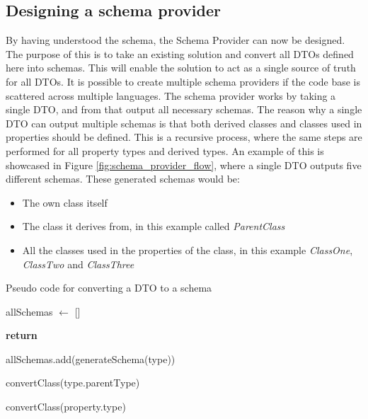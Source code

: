 \subsection{Designing a schema provider \label{sec:design:schema_provider}}
By having understood the schema, the Schema Provider can now be designed. The purpose of this is to take an existing solution and convert all DTOs defined here into schemas. This will enable the solution to act as a single source of truth for all DTOs.
It is possible to create multiple schema providers if the code base is scattered across multiple languages.
\newline\newline
The schema provider works by taking a single DTO, and from that output all necessary schemas. 
The reason why a single DTO can output multiple schemas is that both derived classes and classes used in properties should be defined. This is a recursive process, where the same steps are performed for all property types and derived types.
An example of this is showcased in Figure \ref{fig:schema_provider_flow}, where a single DTO outputs five different schemas. 
These generated schemas would be:
\begin{itemize}
    \item The own class itself
    \item The class it derives from, in this example called \textit{ParentClass}
    \item All the classes used in the properties of the class, in this example \textit{ClassOne}, \textit{ClassTwo} and \textit{ClassThree}
\end{itemize}

\begin{algorithm}
\caption{Pseudo code for converting a DTO to a schema}
\label{code:schema_provider_pseudo}
\begin{algorithmic}[1]

\State allSchemas $\gets$ []

        \State \textbf{return}
    \EndIf

    \State allSchemas.add(generateSchema(type))

        \State convertClass(type.parentType)
    \EndIf

        \State convertClass(property.type)
    \EndFor
\EndFunction

\end{algorithmic}
\end{algorithm}

